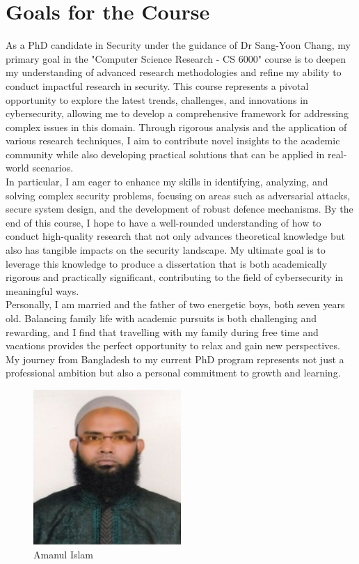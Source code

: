 

\section{Goals for the Course}

As a PhD candidate in Security under the guidance of Dr Sang-Yoon Chang, my primary goal in the "Computer Science Research - CS 6000" course is to deepen my understanding of advanced research methodologies and refine my ability to conduct impactful research in security. This course represents a pivotal opportunity to explore the latest trends, challenges, and innovations in cybersecurity, allowing me to develop a comprehensive framework for addressing complex issues in this domain. Through rigorous analysis and the application of various research techniques, I aim to contribute novel insights to the academic community while also developing practical solutions that can be applied in real-world scenarios.\\

In particular, I am eager to enhance my skills in identifying, analyzing, and solving complex security problems, focusing on areas such as adversarial attacks, secure system design, and the development of robust defence mechanisms. By the end of this course, I hope to have a well-rounded understanding of how to conduct high-quality research that not only advances theoretical knowledge but also has tangible impacts on the security landscape. My ultimate goal is to leverage this knowledge to produce a dissertation that is both academically rigorous and practically significant, contributing to the field of cybersecurity in meaningful ways.\\

Personally, I am married and the father of two energetic boys, both seven years old. Balancing family life with academic pursuits is both challenging and rewarding, and I find that travelling with my family during free time and vacations provides the perfect opportunity to relax and gain new perspectives. My journey from Bangladesh to my current PhD program represents not just a professional ambition but also a personal commitment to growth and learning.

\begin{figure}[h!]
\centering
\includegraphics[width=0.5\textwidth]{images/Amanul_Islam.jpg}
\caption{Amanul Islam}
\label{fig:myphoto}
\end{figure}


